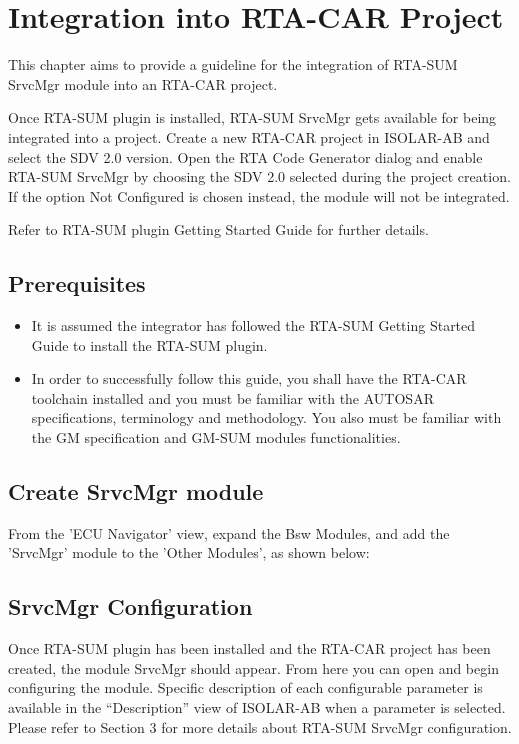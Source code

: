 \chapter{Integration into RTA-CAR Project}
\label{ch:IntGuide}

This chapter aims to provide a guideline for the integration of RTA-SUM SrvcMgr module into an RTA-CAR project.

Once RTA-SUM plugin is installed, RTA-SUM SrvcMgr gets available for being integrated into a project. Create a new RTA-CAR project in ISOLAR-AB and select the SDV 2.0 version. 
Open the RTA Code Generator dialog and enable RTA-SUM SrvcMgr by choosing the SDV 2.0 selected during the project creation. If the option Not Configured is chosen instead, the module will not be integrated.

Refer to RTA-SUM plugin Getting Started Guide for further details.

\section {Prerequisites}
\begin{itemize}
\item It is assumed the integrator has followed the RTA-SUM Getting Started Guide to install the RTA-SUM plugin.
\item In order to successfully follow this guide, you shall have the RTA-CAR toolchain installed and you must be familiar with the AUTOSAR specifications, terminology and methodology. You also must be familiar with the GM specification and GM-SUM modules functionalities.
\end{itemize}

\section{Create SrvcMgr module}

From the 'ECU Navigator' view, expand the Bsw Modules, and add the 'SrvcMgr' module to the 'Other Modules', as shown below:


\section{SrvcMgr Configuration}
Once RTA-SUM plugin has been installed and the RTA-CAR project has been created, the module SrvcMgr should
appear. From here you can open and begin configuring the module. Specific description of each configurable
parameter is available in the “Description” view of ISOLAR-AB when a parameter is selected.
Please refer to Section 3 for more details about RTA-SUM SrvcMgr configuration.
